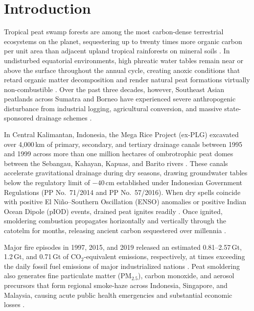 \section{Introduction}
\label{sec:introduction}

Tropical peat swamp forests are among the most carbon-dense terrestrial ecosystems on the planet, sequestering up to twenty times more organic carbon per unit area than adjacent upland tropical rainforests on mineral soils \citep{Page2002Nature, Dommain2011ProcRSocB}. In undisturbed equatorial environments, high phreatic water tables remain near or above the surface throughout the annual cycle, creating anoxic conditions that retard organic matter decomposition and render natural peat formations virtually non-combustible \citep{Wosten2008Geoderma, Dadap2021NatComm}. Over the past three decades, however, Southeast Asian peatlands across Sumatra and Borneo have experienced severe anthropogenic disturbance from industrial logging, agricultural conversion, and massive state-sponsored drainage schemes \citep{Miettinen2016ERL, Dohong2017RestorEcol, Langner2007IJWF, Carlson2012PNAS}.

In Central Kalimantan, Indonesia, the Mega Rice Project (ex-PLG) excavated over 4,000\,km of primary, secondary, and tertiary drainage canals between 1995 and 1999 across more than one million hectares of ombrotrophic peat domes between the Sebangau, Kahayan, Kapuas, and Barito rivers \citep{Silvius2005Wetlands, Ritzema2014HESS}. These canals accelerate gravitational drainage during dry seasons, drawing groundwater tables below the regulatory limit of $-40$\,cm established under Indonesian Government Regulations (PP No.~71/2014 and PP No.~57/2016). When dry spells coincide with positive El Ni\~no--Southern Oscillation (ENSO) anomalies or positive Indian Ocean Dipole (pIOD) events, drained peat ignites readily \citep{Cochrane2003Nature, Hooijer2012Biogeosciences, Field2016PNAS}. Once ignited, smoldering combustion propagates horizontally and vertically through the catotelm for months, releasing ancient carbon sequestered over millennia \citep{Usup2004Tropics, Wooster2018NatGeosci, Vetrita2020RemoteSensing}.

Major fire episodes in 1997, 2015, and 2019 released an estimated 0.81--2.57\,Gt, 1.2\,Gt, and 0.71\,Gt of $\text{CO}_2$-equivalent emissions, respectively, at times exceeding the daily fossil fuel emissions of major industrialized nations \citep{Page2002Nature, Field2016PNAS, VanderWerf2017ESSD}. Peat smoldering also generates fine particulate matter ($\text{PM}_{2.5}$), carbon monoxide, and aerosol precursors that form regional smoke-haze across Indonesia, Singapore, and Malaysia, causing acute public health emergencies and substantial economic losses \citep{Gaveau2014PLOSONE, Kiely2021ACP, Graham2022SciRep}.

